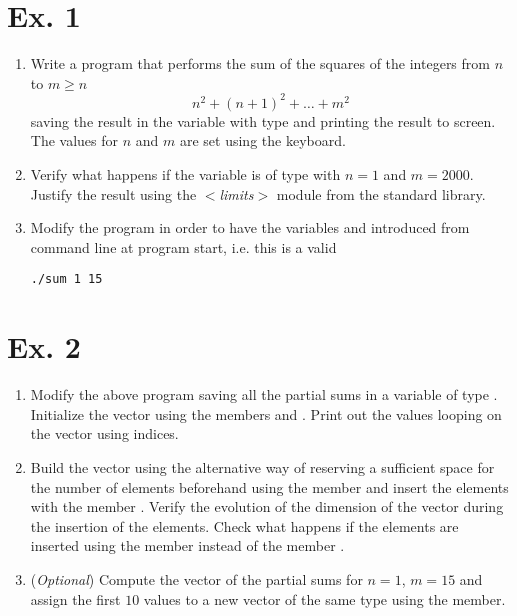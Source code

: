 \section*{Ex. 1}
\begin{enumerate}
\item Write a program that performs the sum of the squares of the integers from
$n$ to $m\ge n$
\begin{equation*}
n^2 + \left(n+1\right)^2 + \ldots + m^2
\end{equation*}
saving the result in the variable  with type  and printing
the result to screen. The values for $n$ and $m$ are set using the keyboard.
\item Verify what happens if the variable  is of  type with
$n=1$ and $m=2000$. Justify the result using the \emph{$<$limits$>$} module
from the standard library.
\item Modify the program in order to have the variables  and 
introduced from command line at program start, i.e. this is a valid
\begin{verbatim}
./sum 1 15
\end{verbatim}
\end{enumerate}

\section*{Ex. 2}
\begin{enumerate}
\item Modify the above program saving all the partial sums in a variable
 of type . Initialize the vector using the
members  and . Print out the values looping on
the vector using indices.
\item Build the vector  using the alternative way of reserving a
sufficient space for the number of elements beforehand using the member
 and insert the elements with the member .
Verify the evolution of the dimension of the vector during the insertion of the
elements. Check what happens if the elements are inserted using the member
 instead of the member .

\item (\emph{Optional}) Compute the vector of the partial sums for $n=1$, $m=15$
and assign the first $10$ values to a new vector  of the same type
using the  member.
\end{enumerate}
